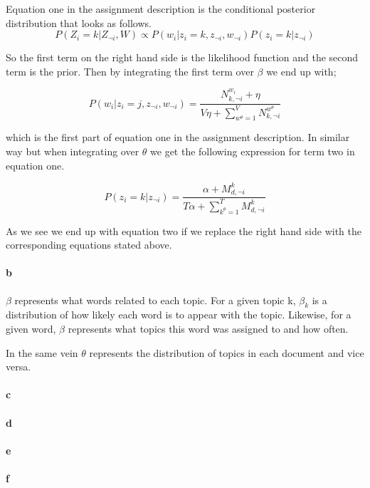 \documentclass{article}
\begin{document}
Equation one in the assignment description is the conditional posterior distribution that looks as follows.
$$ P(Z_i = k | Z_{\neg i}, W) \propto P(w_i | z_i = k, z_{\neg i}, w_{\neg i})P(z_i = k | z_{\neg i })$$

So the first term on the right hand side is the likelihood function and the second term is the prior. Then by integrating the first term over $\beta$ we end up with;

$$P(w_i | z_i = j, z_{\neg i}, w_{\neg i}) = \frac{ N^{w_i}_{k,\neg i} + \eta }{V\eta + \sum_{w^{\theta}=1}^V N^{w^\theta}_{k, \neg i}}  $$

which is the first part of equation one in the assignment description. In similar way but when integrating over $\theta$ we get the following expression for term two in equation one.

$$P(z_i = k | z_{\neg i}) = \frac{\alpha + M^{k}_{d,\neg i}}{T\alpha + \sum_{k^\theta=1}^T M^k_{d, \neg i} } $$

As we see we end up with equation two if we replace the right hand side with the corresponding equations stated above.
\paragraph{b}

$\beta$ represents what words related to each topic. For a given topic k,
$\beta_k$ is a distribution of how likely each word is to appear with the
topic. Likewise, for a given word, $\beta$ represents what topics this word was
assigned to and how often.

In the same vein $\theta$ represents the distribution of topics in each
document and vice versa.

\paragraph{c}
\paragraph{d}
\paragraph{e}
\paragraph{f}
\end{document}
